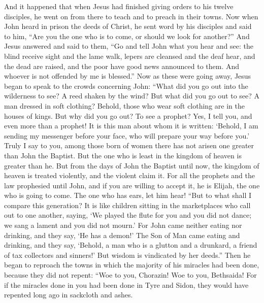 \begin{biblechapter} %
 And it happened that when Jesus had finished giving orders to his twelve disciples, he went on from there to teach and to preach in their towns.
\verse Now when John heard in prison the deeds of Christ, he sent word by his disciples
\verse and said to him, “Are you the one who is to come, or should we look for another?”
\verse And Jesus answered and said to them, “Go and tell John what you hear and see:
\verse the blind receive sight and the lame walk, lepers are cleansed and the deaf hear, and the dead are raised, and the poor have good news announced to them.
\verse And whoever is not offended by me is blessed.”
\verse Now as these were going away, Jesus began to speak to the crowds concerning John: “What did you go out into the wilderness to see? A reed shaken by the wind?
\verse But what did you go out to see? A man dressed in soft clothing? Behold, those who wear soft clothing are in the houses of kings.
\verse But why did you go out? To see a prophet? Yes, I tell you, and even more than a prophet!
\verse It is this man about whom it is written: ‘Behold, I am sending my messenger before your face, 
who will prepare your way before you.’
\verse Truly I say to you, among those born of women there has not arisen one greater than John the Baptist. But the one who is least in the kingdom of heaven is greater than he.
\verse But from the days of John the Baptist until now, the kingdom of heaven is treated violently, and the violent claim it.
\verse For all the prophets and the law prophesied until John,
\verse and if you are willing to accept it, he is Elijah, the one who is going to come.
\verse The one who has ears, let him hear!
\verse “But to what shall I compare this generation? It is like children sitting in the marketplaces who call out to one another,
\verse saying, ‘We played the flute for you and you did not dance; 
we sang a lament and you did not mourn.’
\verse For John came neither eating nor drinking, and they say, ‘He has a demon!’
\verse The Son of Man came eating and drinking, and they say, ‘Behold, a man who is a glutton and a drunkard, a friend of tax collectors and sinners!’ But wisdom is vindicated by her deeds.”
 Then he began to reproach the towns in which the majority of his miracles had been done, because they did not repent:
\verse “Woe to you, Chorazin! Woe to you, Bethsaida! For if the miracles done in you had been done in Tyre and Sidon, they would have repented long ago in sackcloth and ashes.

\end{biblechapter}
